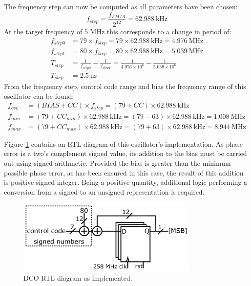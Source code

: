 The frequency step can now be computed as all parameters have been chosen:
\begin{equation}
f_{step} = \frac{f_{FPGA}}{2^{12}} = 62.988~\si{\kilo\hertz}
\end{equation}
At the target frequency of 5 MHz this corresponds to a change in period of:
\begin{align}
f_{step0} &= 79 \times f_{step} = 79 \times 62.988~\si{\kilo\hertz} = 4.976~\si{\mega\hertz} \\
f_{step1} &= 80 \times f_{step} = 80 \times 62.988~\si{\kilo\hertz} = 5.039~\si{\mega\hertz} \\
T_{step}  &= \frac{1}{f_{step0}} - \frac{1}{f_{step1}} = \frac{1}{4.976\times 10^6} - \frac{1}{5.039\times 10^6} \\
T_{step}  &= 2.5~\si{\nano\second}
\end{align}
From the frequency step, control code range and bias the frequency range of this oscillator can be found:
\begin{align}
f_{osc} &= (BIAS+CC)\times f_{step} = (79+CC)\times 62.988~\si{\kilo\hertz}\\
f_{min} &= (79+CC_{min})\times 62.988~\si{\kilo\hertz} = (79-63)\times 62.988~\si{\kilo\hertz} = 1.008~\si{\mega\hertz}\\
f_{max} &= (79+CC_{max})\times 62.988~\si{\kilo\hertz} = (79+63)\times 62.988~\si{\kilo\hertz} = 8.944~\si{\mega\hertz}
\end{align}

Figure \ref{fig:osc2_impl} contains an \ac{RTL} diagram of this oscillator's implementation. As phase error is a two's complement signed value, its addition to the bias must be carried out using signed arithmetic. Provided the bias is greater than the minimum possible phase error, as has been ensured in this case, the result of this addition is positive signed integer. Being a positive quantity, additional logic performing a conversion from a signed to an unsigned representation is required.
\begin{figure}[h]%
    \centering
    \includegraphics[width=0.8\textwidth]{../osc2_impl} 
    \caption[\ac{DCO} \ac{RTL} diagram as implemented]{\ac{DCO} \ac{RTL} diagram as implemented.}
    \label{fig:osc2_impl}
\end{figure}

